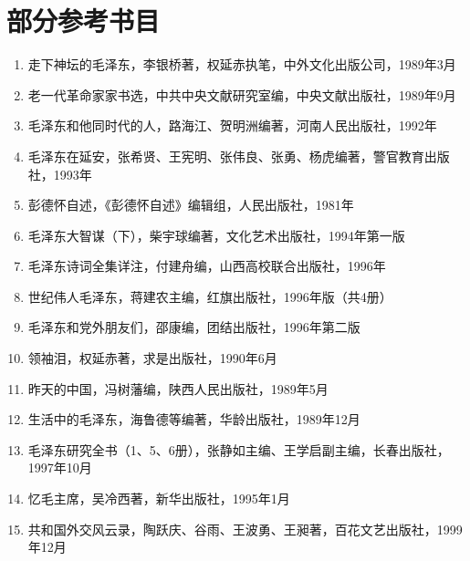 \documentclass[../dazhuan.tex]{subfiles}
\begin{document}
\clearpage
\chapter*{部分参考书目}

\begin{enumerate}

\item 走下神坛的毛泽东，李银桥著，权延赤执笔，中外文化出版公司，1989年3月

\item 老一代革命家家书选，中共中央文献研究室编，中央文献出版社，1989年9月

\item 毛泽东和他同时代的人，路海江、贺明洲编著，河南人民出版社，1992年

\item 毛泽东在延安，张希贤、王宪明、张伟良、张勇、杨虎编著，警官教育出版社，1993年

\item 彭德怀自述，《彭德怀自述》编辑组，人民出版社，1981年

\item 毛泽东大智谋（下），柴宇球编著，文化艺术出版社，1994年第一版

\item 毛泽东诗词全集详注，付建舟编，山西高校联合出版社，1996年

\item 世纪伟人毛泽东，蒋建农主编，红旗出版社，1996年版（共4册）

\item 毛泽东和党外朋友们，邵康编，团结出版社，1996年第二版

\item 领袖泪，权延赤著，求是出版社，1990年6月

\item 昨天的中国，冯树藩编，陕西人民出版社，1989年5月

\item 生活中的毛泽东，海鲁德等编著，华龄出版社，1989年12月

\item 毛泽东研究全书（1、5、6册），张静如主编、王学启副主编，长春出版社，1997年10月

\item 忆毛主席，吴冷西著，新华出版社，1995年1月

\item 共和国外交风云录，陶跃庆、谷雨、王波勇、王昶著，百花文艺出版社，1999年12月


\end{enumerate}
\end{document}
